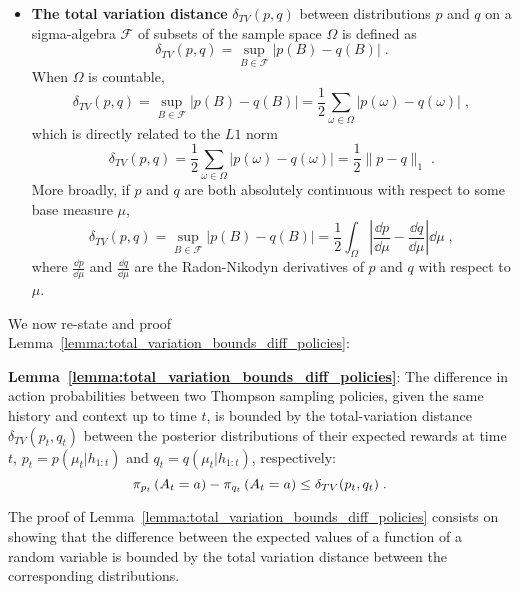 \begin{itemize}
	\item \textbf{The total variation distance} $\delta_{TV}(p,q)$ between distributions $p$ and $q$ on a sigma-algebra $\mathcal{F}$ of subsets of the sample space $\Omega$ is defined as
\begin{equation}
\delta_{TV}(p, q) = \sup_{B \in \mathcal{F}} \left|p(B)-q(B)\right| \; .
\end{equation}
When $\Omega$ is countable,
\begin{equation}
\delta_{TV}(p, q) = \sup_{B \in \mathcal{F}} \left|p(B)-q(B)\right| = \frac{1}{2} \sum_{\omega \in \Omega} \left|p(\omega) - q(\omega) \right| \; ,
\end{equation}
which is directly related to the $L1$ norm
\begin{equation}
\delta_{TV}(p, q) = \frac{1}{2} \sum_{\omega \in \Omega} \left|p(\omega) - q(\omega) \right| = \frac{1}{2} \|p-q\|_{1} \;.
\end{equation}
More broadly, if $p$ and $q$ are both absolutely continuous with respect to some base measure $\mu$,
\begin{equation}
\delta_{TV}(p, q) = \sup_{B \in \mathcal{F}} \left|p(B)-q(B)\right| = \frac{1}{2} \int_{\Omega} \left|\frac{\dd{p}}{\dd{\mu}} - \frac{\dd{q}}{\dd{\mu}} \right|  \dd{\mu} \; ,
\end{equation}
where $\frac{\dd{p}}{\dd{\mu}}$ and $\frac{\dd{q}}{\dd{\mu}}$ are the Radon-Nikodyn derivatives of $p$ and $q$ with respect to $\mu$.\\
\end{itemize}

We now re-state and proof Lemma~\ref{lemma:total_variation_bounds_diff_policies}:

\textbf{Lemma~\ref{lemma:total_variation_bounds_diff_policies}}:
The difference in action probabilities between two Thompson sampling policies, given the same history and context up to time $t$, is bounded by the total-variation distance $\delta_{TV}(p_t,q_t)$ between the posterior distributions of their expected rewards at time $t$, $p_t=p(\mu_{t}|h_{1:t})$ and $q_t=q(\mu_{t}|h_{1:t})$, respectively:
\begin{equation}
\pi_{p_t}\left( A_t=a \right) - \pi_{q_t}\left( A_t=a \right) \leq \delta_{TV}(p_t,q_t) \; .
\label{eq:lemma_1_equation}
\end{equation}

The proof of Lemma~\ref{lemma:total_variation_bounds_diff_policies} consists on showing that the difference between the expected values of a function of a random variable is bounded by the total variation distance between the corresponding distributions. 

